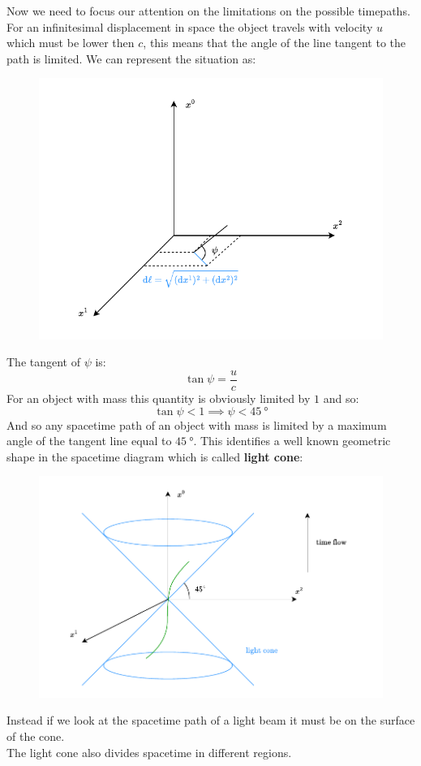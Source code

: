 Now we need to focus our attention on the limitations on the possible timepaths. For an infinitesimal displacement in space the object travels with velocity $u$ which must be lower then $c$, this means that the angle of the line tangent to the path is limited. We can represent the situation as:
\begin{figure}[H]
  \centering
  \includegraphics[width=0.8\linewidth]{res/svg/spacetime_angle.drawio}
\end{figure}
The tangent of $\psi$ is:
\begin{equation}
  \tan \psi = \dfrac{u}{c}
\end{equation}
For an object with mass this quantity is obviously limited by $1$ and so:
\begin{equation}
  \tan \psi < 1 \implies \psi < \qty{45}{\degree}
\end{equation}
And so any spacetime path of an object with mass is limited by a maximum angle of the tangent line equal to $\qty{45}{\degree}$. This identifies a well known geometric shape in the spacetime diagram which is called \textbf{light cone}:
\begin{figure}[H]
  \centering
  \includegraphics[width=0.8\linewidth]{res/svg/light_cone.drawio}
\end{figure}
Instead if we look at the spacetime path of a light beam it must be on the surface of the cone.\\
The light cone also divides spacetime in different regions.
